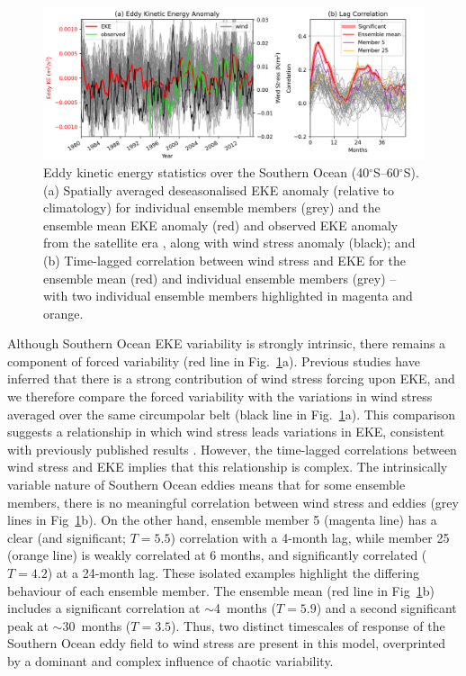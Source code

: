 \documentclass[linenumbers]{agujournal2019}
\begin{document}
\begin{figure}[t]
\begin{center}
\includegraphics[width=\hsize]{Figure2}
\caption{Eddy kinetic energy statistics over the Southern Ocean (40$^\circ$S--60$^\circ$S). (a) Spatially averaged deseasonalised EKE anomaly (relative to climatology) for individual ensemble members (grey) and the ensemble mean EKE anomaly (red) and observed EKE anomaly from the satellite era \citep[green line; calculated from ][]{Martinez-Moreno2022}, along with wind stress anomaly (black); and (b) Time-lagged correlation between wind stress and EKE for the ensemble mean (red) and individual ensemble  members (grey) -- with two individual ensemble members highlighted in magenta and orange.}
\label{Fig:2}
\end{center}
\end{figure}

Although Southern Ocean EKE variability is strongly intrinsic, there remains a component of forced variability (red line in Fig.~\ref{Fig:2}a).
Previous studies have inferred that there is a strong contribution of wind stress forcing upon EKE, and we therefore compare the forced variability with the variations in wind stress averaged over the same circumpolar belt (black line in Fig.~\ref{Fig:2}a).
This comparison suggests a relationship in which wind stress leads variations in EKE, consistent with previously published results \citep{Meredith-Hogg-2006,Hogg2015}.
However, the time-lagged correlations between wind stress and EKE implies that this relationship is complex. 
The intrinsically variable nature of Southern Ocean eddies means that for some ensemble members, there is no meaningful correlation between wind stress and eddies (grey lines in Fig~\ref{Fig:2}b).
On the other hand, ensemble member 5 (magenta line) has a clear (and significant; $T = 5.5$) correlation with a 4-month lag, while member 25 (orange line) is weakly correlated at 6 months, and significantly correlated ($T = 4.2$) at a 24-month lag.
These isolated examples highlight the differing behaviour of each ensemble member. 
The ensemble mean (red line in Fig~\ref{Fig:2}b) includes a significant correlation at $\sim$4~months ($T=5.9$) and a second significant peak at $\sim$30~months ($T=3.5$).
Thus, two distinct timescales of response of the Southern Ocean eddy field to wind stress are present in this model, overprinted by a dominant and complex influence of chaotic variability. 
\end{document}
